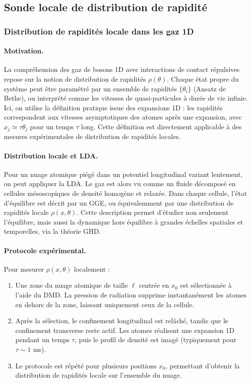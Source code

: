 \subsection{Sonde locale de distribution de rapidité}


\subsubsection{Distribution de rapidités locale dans les gaz 1D}

\paragraph{Motivation.}  
La compréhension des gaz de bosons 1D avec interactions de contact répulsives repose sur la notion de distribution de rapidités \(\rho(\theta)\). Chaque état propre du système peut être paramétré par un ensemble de rapidités \(\{\theta_i\}\) (Ansatz de Bethe), ou interprété comme les vitesses de quasi-particules à durée de vie infinie. Ici, on utilise la définition pratique issue des expansions 1D : les rapidités correspondent aux vitesses asymptotiques des atomes après une expansion, avec \(x_j \simeq \tau \theta_j\) pour un temps \(\tau\) long. Cette définition est directement applicable à des mesures expérimentales de distribution de rapidités locales.

\paragraph{Distribution locale et LDA.}  
Pour un nuage atomique piégé dans un potentiel longitudinal variant lentement, on peut appliquer la \gls{LDA}. Le gaz est alors vu comme un fluide décomposé en cellules mésoscopiques de densité homogène et relaxée. Dans chaque cellule, l’état d’équilibre est décrit par un \gls{GGE}, ou équivalemment par une distribution de rapidités locale \(\rho(x,\theta)\). Cette description permet d’étudier non seulement l’équilibre, mais aussi la dynamique hors équilibre à grandes échelles spatiales et temporelles, via la théorie \gls{GHD}.

\paragraph{Protocole expérimental.}  
Pour mesurer \(\rho(x,\theta)\) localement :  
\begin{enumerate}
    \item Une zone du nuage atomique de taille \(\ell\) centrée en \(x_0\) est sélectionnée à l’aide du \gls{DMD}. La pression de radiation supprime instantanément les atomes en dehors de la zone, laissant uniquement ceux de la cellule.
    \item Après la sélection, le confinement longitudinal est relâché, tandis que le confinement transverse reste actif. Les atomes réalisent une expansion 1D pendant un temps \(\tau\), puis le profil de densité est imagé (typiquement pour \(\tau\sim 1\) ms).
    \item Le protocole est répété pour plusieurs positions \(x_0\), permettant d’obtenir la distribution de rapidités locale sur l’ensemble du nuage.
\end{enumerate}

